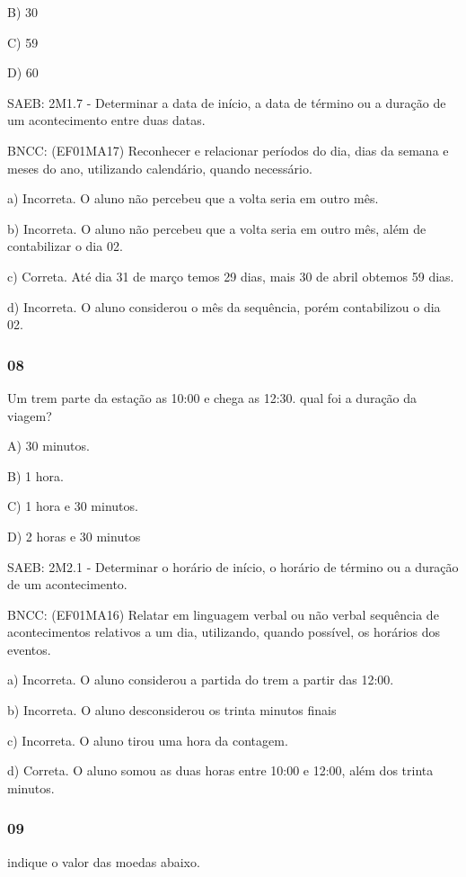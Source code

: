 B) 30

C) 59

D) 60

SAEB: 2M1.7 - Determinar a data de início, a data de término ou a
duração de um acontecimento entre duas datas.

BNCC: (EF01MA17) Reconhecer e relacionar períodos do dia, dias da semana
e meses do ano, utilizando calendário, quando necessário.

a) Incorreta. O aluno não percebeu que a volta seria em outro mês.

b) Incorreta. O aluno não percebeu que a volta seria em outro mês, além
de contabilizar o dia 02.

c) Correta. Até dia 31 de março temos 29 dias, mais 30 de abril obtemos
59 dias.

d) Incorreta. O aluno considerou o mês da sequência, porém contabilizou
o dia 02.

\subsubsection{08}\label{section-109}

Um trem parte da estação as 10:00 e chega as 12:30. qual foi a duração
da viagem?

A) 30 minutos.

B) 1 hora.

C) 1 hora e 30 minutos.

D) 2 horas e 30 minutos

SAEB: 2M2.1 - Determinar o horário de início, o horário de término ou a
duração de um acontecimento.

BNCC: (EF01MA16) Relatar em linguagem verbal ou não verbal sequência de
acontecimentos relativos a um dia, utilizando, quando possível, os
horários dos eventos.

a) Incorreta. O aluno considerou a partida do trem a partir das 12:00.

b) Incorreta. O aluno desconsiderou os trinta minutos finais

c) Incorreta. O aluno tirou uma hora da contagem.

d) Correta. O aluno somou as duas horas entre 10:00 e 12:00, além dos
trinta minutos.

\subsubsection{09}\label{section-110}

indique o valor das moedas abaixo.

